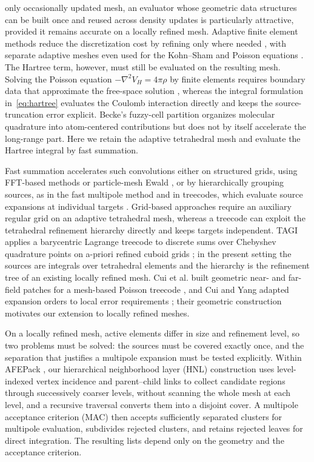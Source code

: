 \documentclass[a4paper,pdflatex,sn-mathphys-num]{sn-jnl}
\theoremstyle{thmstyleone}
\begin{document}
only occasionally updated mesh, an evaluator whose geometric data structures can
be built once and reused across density updates is particularly attractive,
provided it remains accurate on a locally refined mesh.
Adaptive finite element methods reduce the discretization cost by refining only
where needed \cite{BaoHuLiu2012,HuXieXu2018,YangShenHu2021,Hu2026}, with separate
adaptive meshes even used for the Kohn--Sham and Poisson equations
\cite{Kuang2024}. The Hartree term, however, must still be evaluated on the
resulting mesh. Solving the Poisson equation $-\nabla^2 V_H=4\pi\rho$ by finite
elements requires boundary data that approximate the free-space solution
\cite{BaoHuLiu2012,Kuang2024}, whereas the integral formulation
in~\eqref{eq:hartree} evaluates the Coulomb interaction directly and keeps the
source-truncation error explicit. Becke's fuzzy-cell partition organizes
molecular quadrature into atom-centered contributions \cite{Becke1988Multicenter}
but does not by itself accelerate the long-range part. Here we retain the
adaptive tetrahedral mesh and evaluate the Hartree integral by fast summation.

Fast summation accelerates such convolutions either on structured grids, using
FFT-based methods or particle-mesh Ewald \cite{Genovese2006,Darden1993}, or by
hierarchically grouping sources, as in the fast multipole method
\cite{Greengard1987,Yokota2013,JiangGreengard2025} and in treecodes, which
evaluate source expansions at individual targets \cite{Appel1985,Barnes1986}.
Grid-based approaches require an auxiliary regular grid on an adaptive
tetrahedral mesh, whereas a treecode can exploit the tetrahedral refinement
hierarchy directly and keeps targets independent. TAGI applies a barycentric
Lagrange treecode to discrete sums over Chebyshev quadrature points on
a-priori refined cuboid grids \cite{TAGI2020}; in the present setting the
sources are integrals over tetrahedral elements and the hierarchy is the
refinement tree of an existing locally refined mesh. Cui et al. built geometric
near- and far-field patches for a mesh-based Poisson treecode \cite{Cui}, and
Cui and Yang adapted expansion orders to local error requirements
\cite{CuiYang2025}; their geometric construction motivates our extension to
locally refined meshes.

On a locally refined mesh, active elements differ in size and refinement level,
so two problems must be solved: the sources must be covered exactly once, and
the separation that justifies a multipole expansion must be tested explicitly.
Within AFEPack \cite{AFEPack}, our hierarchical neighborhood layer (HNL)
construction uses level-indexed vertex incidence and parent--child links to
collect candidate regions through successively coarser levels, without scanning
the whole mesh at each level, and a recursive traversal converts them into a
disjoint cover. A multipole acceptance criterion (MAC) \cite{Barnes1986,Cui}
then accepts sufficiently separated clusters for multipole evaluation,
subdivides rejected clusters, and retains rejected leaves for direct
integration. The resulting lists depend only on the geometry and the acceptance criterion.
\end{document}

